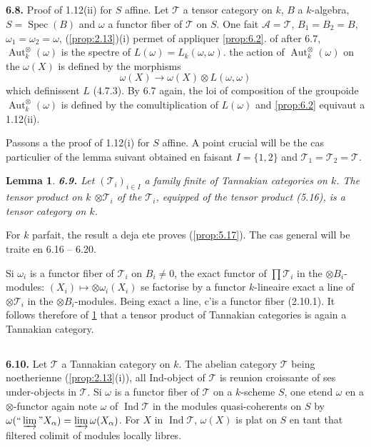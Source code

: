 \documentclass[12pt,a4paper]{article}
\theoremstyle{plain}
\newtheorem{lemma}[theorem]{Lemma}
\theoremstyle{definition}
\theoremstyle{remark}
\DeclareMathOperator{\Aut}{Aut}
\DeclareMathOperator{\Spec}{Spec}
\DeclareMathOperator{\Ind}{Ind}
\begin{document}
\subsection{}

\textbf{6.8.} Proof of 1.12(ii) for $S$ affine. Let $\mathcal{T}$ a tensor category on $k$, $B$ a $k$-algebra, $S = \Spec(B)$ and $\omega$ a functor fiber of $\mathcal{T}$ on $S$. One fait $\mathcal{A} = \mathcal{T}$, $B_1 = B_2 = B$, $\omega_1 = \omega_2 = \omega$, (\ref{prop:2.13})(i) permet of appliquer \ref{prop:6.2}. of after 6.7, $\Aut^\otimes_k(\omega)$ is the spectre of $L(\omega) = L_k(\omega,\omega)$. the action of $\Aut^\otimes_k(\omega)$ on the $\omega(X)$ is defined by the morphisms
\[
\omega(X) \to \omega(X) \otimes L(\omega,\omega)
\]
which definissent $L$ (4.7.3). By 6.7 again, the loi of composition of the groupoide $\Aut^\otimes_k(\omega)$ is defined by the comultiplication of $L(\omega)$ and \ref{prop:6.2} equivaut a 1.12(ii).

Passons a the proof of 1.12(i) for $S$ affine. A point crucial will be the cas particulier of the lemma suivant obtained en faisant $I = \{1,2\}$ and $\mathcal{T}_1 = \mathcal{T}_2 = \mathcal{T}$.

\begin{lemma}\label{lem:6.9}
\textbf{6.9.} Let $(\mathcal{T}_i)_{i \in I}$ a family finite of Tannakian categories on $k$. The tensor product on $k$ $\otimes \mathcal{T}_i$ of the $\mathcal{T}_i$, equipped of the tensor product (5.16), is a tensor category on $k$.
\end{lemma}

For $k$ parfait, the result a deja ete proves (\ref{prop:5.17}). The cas general will be traite en 6.16 -- 6.20.

Si $\omega_i$ is a functor fiber of $\mathcal{T}_i$ on $B_i \neq 0$, the exact functor of $\prod \mathcal{T}_i$ in the $\otimes B_i$-modules: $(X_i) \mapsto \otimes \omega_i(X_i)$ se factorise by a functor $k$-lineaire exact a line of $\otimes \mathcal{T}_i$ in the $\otimes B_i$-modules. Being exact a line, c'is a functor fiber (2.10.1). It follows therefore of \ref{lem:6.9} that a tensor product of Tannakian categories is again a Tannakian category.

\subsection{}

\textbf{6.10.} Let $\mathcal{T}$ a Tannakian category on $k$. The abelian category $\mathcal{T}$ being noetherienne (\ref{prop:2.13}(i)), all Ind-object of $\mathcal{T}$ is reunion croissante of ses under-objects in $\mathcal{T}$. Si $\omega$ is a functor fiber of $\mathcal{T}$ on a $k$-scheme $S$, one etend $\omega$ en a $\otimes$-functor again note $\omega$ of $\Ind\mathcal{T}$ in the modules quasi-coherents on $S$ by $\omega(``\varinjlim" X_\alpha) = \varinjlim \omega(X_\alpha)$. For $X$ in $\Ind\mathcal{T}$, $\omega(X)$ is plat on $S$ en tant that filtered colimit of modules locally libres.
\end{document}
